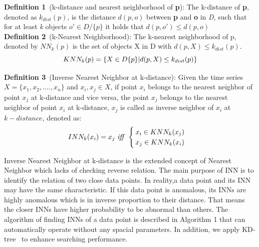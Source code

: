 \textbf{Definition 1}~(k-distance and nearest neighborhood of \textbf{p}): The k-distance of \textbf{p}, denoted as $ k_{dist}(p) $, is the distance $ d(p,o) $ between \textbf{p} and \textbf{o} in \textit{D}, such that for at least \textit{k} objects $ o' \in D/\{p\}  $ it holds that $ d(p,o') \leqslant d(p,o) $\\

\textbf{Definition 2}~(k-Nearest Neighborhood): The k-nearest neighborhood of p, denoted by $ NN_k(p) $ is the set of objects X in D with $ d(p,X) \leq k_{dist}(p) $.
\begin{equation}\label{key}
KNN_k(p)=\{ X \in D\/\{p\} | d(p,X) \leq k_{dist}(p) \}
\end{equation}

\textbf{Definition 3}~(Inverse Nearest Neighbor at k-distance): Given the time series $ X = \{x_1, x_2, .... , x_n\} $ and $x_i, x_j \in X$, if point $ x_i $ belongs to the nearest neighbor of point $ x_{j}$ at k-distance and vice versa, the point $ x_{j} $ belongs to the nearest neighbor of point $ x_{i} $ at k-distance, $ x_{j} $  is called as inverse neighbor of $ x_i $ at $k-distance $, denoted as:
\begin{equation}
\label{EQ: INN-definition}
 INN_k(x_i) = x_{j} \text{ \textit{iff} } 
 \begin{cases}
 x_i \in KNN_k(x_{j}) &     \\
 x_{j} \in KNN_k(x_i) & 
 \end{cases} 
\end{equation}

Inverse Nearest Neighbor at k-distance is the extended concept of Nearest Neighbor \cite{Huang2016} which lacks of checking reverse relation. The main purpose of INN is to identify the relation of two close data points. In reality,a data point and its INN may have the same characteristic. If this data point is anomalous, its INNs are highly anomalous which is in inverse proportion to their distance. That means the closer INNs have higher probability to be abnormal than others. The algorithm of finding INNs of a data point is described in Algorithm 1 that can automatically operate without any spacial parameters. In addition, we apply KD-tree~\cite{muja2009fast} to enhance searching performance.

